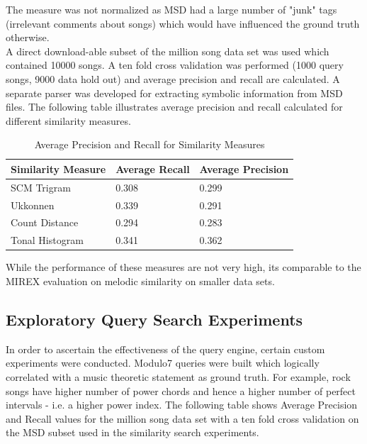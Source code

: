 \documentclass{article}
\begin{document}
\noindent The measure was not normalized as MSD had a large number of "junk" tags (irrelevant comments about songs) which would have influenced the ground truth otherwise. \\

\noindent A direct download-able subset of the million song data set was used which contained 10000 songs. A ten fold cross validation was performed (1000 query songs, 9000 data hold out) and average precision and recall are calculated. A separate parser was developed for extracting symbolic information from MSD files. The following table illustrates average precision and recall calculated for different similarity measures. 

\begin{table}[h]
\begin{center}
    \begin{tabular}{| l | l | l |}
    \hline
    Similarity Measure & Average Recall & Average Precision \\ \hline
    SCM Trigram & 0.308 & 0.299 \\ \hline
    Ukkonnen & 0.339 & 0.291 \\ \hline
    Count Distance & 0.294 & 0.283  \\ \hline
    Tonal Histogram & 0.341 & 0.362  \\ \hline
    \end{tabular}
\end{center}

While the performance of these measures are not very high, its comparable to the MIREX evaluation \cite{mirex} on melodic similarity on smaller data sets. 

\caption{Average Precision and Recall for Similarity Measures}
\end{table}

\subsection{Exploratory Query Search Experiments}

In order to ascertain the effectiveness of the query engine, certain custom experiments were conducted. Modulo7 queries were built which logically correlated with a music theoretic statement as ground truth. For example, rock songs have higher number of power chords and hence a higher number of perfect intervals - i.e. a higher power index. The following table shows Average Precision and Recall values for the million song data set \cite{msd} with a ten fold cross validation on the MSD subset \cite{msd} used in the similarity search experiments. 
\end{document}

